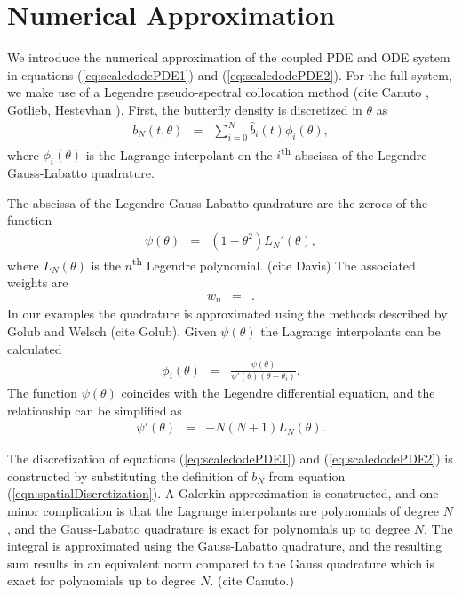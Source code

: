 \documentclass[12pt]{article}
\begin{document}
\section{Numerical Approximation}

We introduce the numerical approximation of the coupled PDE and ODE
system in equations (\ref{eq:scaledodePDE1}) and
(\ref{eq:scaledodePDE2}). For the full system, we make use of a
Legendre pseudo-spectral collocation method (cite Canuto , Gotlieb,
Hestevhan ). First, the butterfly density is discretized in $\theta$
as
\begin{eqnarray}
  \label{eqn:spatialDiscretization}
  b_N(t,\theta) & = & \sum^N_{i=0} \hat{b}_i(t) \phi_i(\theta),
\end{eqnarray}
where $\phi_i(\theta)$ is the Lagrange interpolant on the
$i$\textsuperscript{th} abscissa of the Legendre-Gauss-Labatto
quadrature.

The abscissa of the Legendre-Gauss-Labatto quadrature are the zeroes
of the function
\begin{eqnarray}
  \psi(\theta) & = & \left(1-\theta^2\right) L_{N}'(\theta),
\end{eqnarray}
where $L_N(\theta)$ is the $n$\textsuperscript{th} Legendre
polynomial. (cite Davis) The associated weights are
\begin{eqnarray}
  w_n & = & .
\end{eqnarray}
In our examples the quadrature is approximated using the methods
described by Golub and Welsch (cite Golub).  Given $\psi(\theta)$ the
Lagrange interpolants can be calculated
\begin{eqnarray}
  \phi_i(\theta) & = & \frac{\psi(\theta)}{\psi'(\theta)(\theta-\theta_i)}.
\end{eqnarray}
The function $\psi(\theta)$ coincides with the Legendre differential
equation, and the relationship can be simplified as
\begin{eqnarray}
  \psi'(\theta) & = & -N(N+1)L_N(\theta).
\end{eqnarray}

The discretization of equations (\ref{eq:scaledodePDE1}) and
(\ref{eq:scaledodePDE2}) is constructed by substituting the definition
of $b_N$ from equation (\ref{eqn:spatialDiscretization}). A Galerkin
approximation is constructed, and one minor complication is that the
Lagrange interpolants are polynomials of degree $N$, and the
Gauss-Labatto quadrature is exact for polynomials up to degree
$N$. The integral is approximated using the Gauss-Labatto quadrature,
and the resulting sum results in an equivalent norm compared to the
Gauss quadrature which is exact for polynomials up to degree
$N$. (cite Canuto.)
\end{document}
